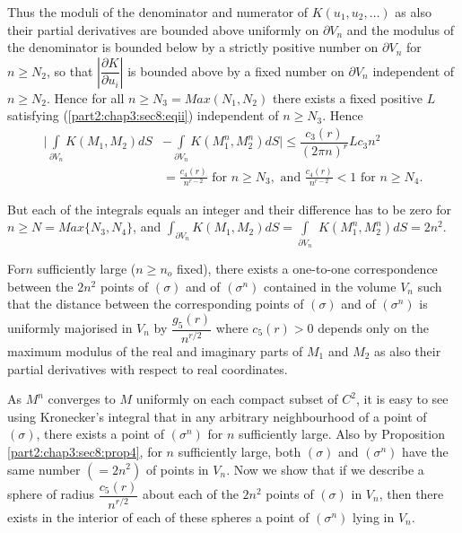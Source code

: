 Thus the moduli of the denominator and numerator of $K (u_1, u_2,
\ldots)$ as also their partial derivatives are bounded above uniformly
on $\partial V_n$ and the modulus of the denominator is bounded below
by a strictly positive number on $\partial V_n$ for $n \geq N_2$, so
that $ |\dfrac{\partial K}{\partial u_i}|$ is bounded above by a fixed
number on $\partial V_n$ independent of $n \geq N_2$. Hence for all $n
\geq N_3 = Max (N_1, N_2)$ there exists a fixed positive $L$
satisfying (\ref{part2:chap3:sec8:eqii}) independent of $n \geq N_3$. Hence 
\begin{align*}
  \big| \int \limits_{\partial V_n} K (M_1, M_2)dS & - \int \limits_{\partial V_n}K
  (M^n_1, M^n_2)dS \big |  \leq \dfrac{c_3 (r)}{(2 \pi n)^r} L c_3 n^2\\
  &= \frac{c_4(r)}{n^{r-2}} \text{ for } n \geq N_3, \text{ and }
  \frac{c_4(r)}{n^{r-2}} < 1 \text{ for } n \geq N_4. 
\end{align*}

But each of the integrals equals an integer and their difference has
to be zero for $n \geq N = Max \{N_3,  N_4 \}$, and $\int_{\partial
  V_n} K (M_1, M_2) dS = \int\limits_{\partial V_n}$ $K (M^n_1, M^n_2)
dS = 2n^2$. 

\begin{proposition}\label{part2:chap3:sec8:prop5}%
  For\pageoriginale $n$ sufficiently large ($n \geq n_o$ fixed), there exists a
  one-to-one correspondence between the $2 n^2$ points of $(\sigma)$
  and of $(\sigma^n)$ contained in the volume $V_n$ such that the
  distance between the corresponding points of $(\sigma)$ and of
  $(\sigma^n)$ is uniformly majorised in $V_n$ by
  $\dfrac{g_5(r)}{n^{r/2}}$ where $c_5(r) > 0$ depends only on the
  maximum modulus of the real and imaginary parts of $M_1$ and $M_2$
  as also their partial derivatives with respect to real coordinates. 
\end{proposition}

As $M^n$ converges to $M$ uniformly on each compact subset of $C^2$,
it is easy to see using Kronecker's integral that in any arbitrary
neighbourhood of a point of $(\sigma)$, there exists a point of
$(\sigma^n)$ for $n$ sufficiently large. Also by
Proposition \ref{part2:chap3:sec8:prop4}, for
$n$ sufficiently large, both $(\sigma)$ and $(\sigma^n)$ have the same
number $(= 2n^2)$ of points in $V_n$. Now we show that if we describe a
sphere of radius $\dfrac{c_5(r)}{n^{r/2}}$ about each of the $2 n^2$
points of $(\sigma)$ in $V_n$, then there exists in the interior of
each of these spheres a point of $(\sigma^n)$ lying in $V_n$. 

